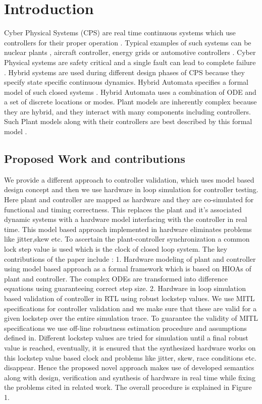 \section{Introduction}

Cyber Physical Systems (CPS) are real time continuous systems which use controllers \citep{Alur2015} for their proper operation . Typical examples of such systems can be nuclear plants \citep{Yoo2008}, aircraft controller, energy grids \citep{Zhabelova2012} or automotive controllers \citep{Park2008}. Cyber Physical systems are safety critical and a single fault can lead to complete failure \citep{Mader2000}. Hybrid systems are used during different design phases of CPS because they specify state specific continuous dynamics. Hybrid Automata specifies a formal model of such closed systems \citep{Hassapis1998}. Hybrid Automata uses a combination of ODE and a set of discrete locations or modes. Plant models are inherently complex because they are hybrid, and they interact with many components including controllers. Such Plant models along with their controllers are best described by this formal model \citep{Raskin2005}.
\subsection{Proposed Work and contributions}
We provide a different approach to controller validation, which uses model based design concept \citep{jensen2011model} and then we use hardware in loop simulation for controller testing. Here plant and controller are mapped as hardware and they are co-simulated for functional and timing correctness. This replaces the plant and it's associated dynamic systems with a hardware model interfacing with the controller in real time. This model based approach implemented in hardware eliminates problems like jitter,skew etc. To ascertain the plant-controller synchronization a common  lock step value is used which is the clock of closed loop system. 
The key contributions of the paper include : 1. Hardware modeling of plant and controller using model based approach \citep{jensen2011model} as a formal framework which is based on HIOAs of plant and controller. The complex ODEs are transformed into difference equations using \citep{bulirsch1966numerical} guaranteeing correct step size. 2. Hardware in loop simulation based validation of controller in RTL using robust lockstep values. We use MITL  specifications for controller validation and we make sure that these are valid for a given lockstep over the entire simulation trace. To guarantee the validity of MITL specifications we use off-line robustness estimation procedure and assumptions defined in\citep{fainekos2007robust}. Different lockstep values are tried for simulation until a final robust value is reached, eventually, it is ensured that the synthesized hardware works on this lockstep value based clock and problems like jitter, skew, race conditions etc. disappear. 
Hence the proposed novel approach makes use of developed semantics along with design, verification and synthesis of hardware in real time while fixing the problems cited in related work. The overall procedure is explained in Figure 1.
